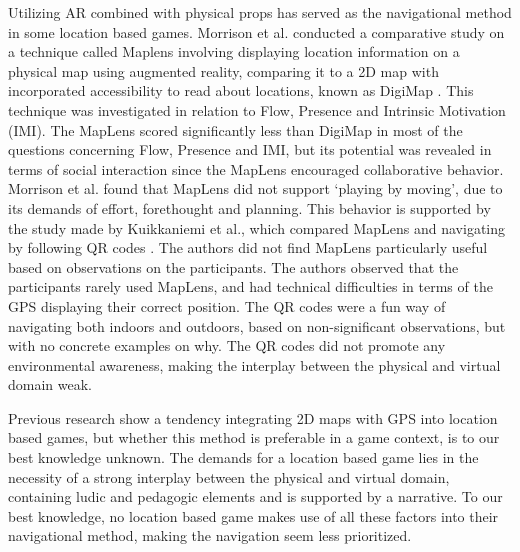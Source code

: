 Utilizing AR combined with physical props has served as the navigational method in some location based games. Morrison et al. conducted a comparative study on a technique called Maplens involving displaying location information on a physical map using augmented reality, comparing it to a 2D map with incorporated accessibility to read about locations, known as DigiMap \cite{Morrison}. This technique was investigated in relation to Flow, Presence and Intrinsic Motivation (IMI). The MapLens scored significantly less than DigiMap in most of the questions concerning Flow, Presence and IMI, but its potential was revealed in terms of social interaction since the MapLens encouraged collaborative behavior.  Morrison et al. found that MapLens did not support ‘playing by moving’, due to its demands of effort, forethought and planning. This behavior is supported by the study made by Kuikkaniemi et al., which compared MapLens and navigating by following QR codes \cite{LostLab}. The authors did not find MapLens particularly useful based on observations on the participants. The authors observed that the participants rarely used MapLens, and had technical difficulties in terms of the GPS displaying their correct position. The QR codes were a fun way of navigating both indoors and outdoors, based on non-significant observations, but with no concrete examples on why. The QR codes did not promote any environmental awareness, making the interplay between the physical and virtual domain weak. 

Previous research show a tendency integrating 2D maps with GPS into location based games, but whether this method is preferable in a game context, is to our best knowledge unknown.  The demands for a location based game lies in the necessity of a strong interplay between the physical and virtual domain, containing ludic and pedagogic elements and is supported by a narrative.  To our best knowledge, no location based game makes use of all these factors into their navigational method, making the navigation seem less prioritized. 

